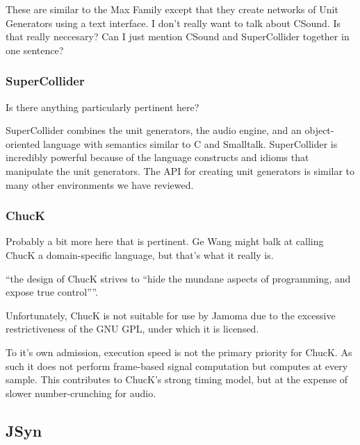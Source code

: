 \documentclass[twoside,10pt]{article}
\begin{document}
These are similar to the Max Family except that they create networks of Unit Generators using a text interface.  I don't really want to talk about CSound.  Is that really neccesary?  Can I just mention CSound and SuperCollider together in one sentence?


\subsubsection{SuperCollider} %

Is there anything particularly pertinent here?\cite{McCartney:1996}

SuperCollider combines the unit generators, the audio engine, and an object-oriented language with semantics similar to C and Smalltalk.  SuperCollider is incredibly powerful because of the language constructs and idioms that manipulate the unit generators.  The API for creating unit generators is similar to many other environments we have reviewed.


\subsubsection{ChucK} %

Probably a bit more here that is pertinent.  Ge Wang might balk at calling ChucK a domain-specific language, but that's what it really is.

``the design of ChucK strives to “hide the mundane aspects of programming, and expose true control”''\cite{wang:2008}.

Unfortunately, ChucK is not suitable for use by Jamoma due to the excessive restrictiveness of the GNU GPL, under which it is licensed.

To it's own admission, execution speed is not the primary priority for ChucK.  As such it does not perform frame-based signal computation but computes at every sample.  This contributes to ChucK's strong timing model, but at the expense of slower number-crunching for audio.




\subsection{JSyn} %
\end{document}
